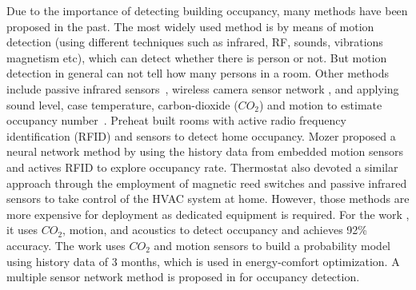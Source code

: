 Due to the importance of detecting building occupancy, many methods
have been proposed in the past. The most widely used method is by
means of motion detection (using different techniques such as infrared,
RF, sounds, vibrations magnetism etc), which can detect whether there is
person or not. But motion detection in general can not tell how many
persons in a room.  Other methods include passive infrared
sensors~\cite{Dodier2006Building}, wireless camera sensor network
\cite{erickson2009energy}, and applying sound level, case temperature,
carbon-dioxide ($CO_2$) and motion to estimate occupancy
number~\cite{Ekwevugbe2013Real}.  Preheat \cite{scott2011ctrl} built
rooms with active radio frequency identification (RFID) and sensors to
detect home occupancy. Mozer \cite{mozer1997neurothermostat} proposed
a neural network method by using the history data from embedded motion
sensors and actives RFID to explore occupancy rate. Thermostat
\cite{lu2010smartthermostat} also devoted a similar approach through
the employment of magnetic reed switches and passive infrared sensors
to take control of the HVAC system at home. However, those methods are
more expensive for deployment as dedicated equipment is required.
\textcolor{feb18rev}{For the work \cite{dong2014real}, it uses $CO_2$,
  motion, and acoustics to detect occupancy and achieves 92\%
  accuracy.  The work \cite{majumdar2014energy} uses $CO_2$ and motion
  sensors to build a probability model using history data of 3 months, which is
  used in energy-comfort optimization. A multiple sensor network
  method is proposed in \cite{yang2016review} for occupancy
  detection.}

